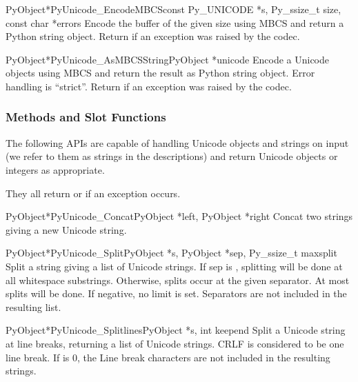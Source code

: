 \begin{cfuncdesc}{PyObject*}{PyUnicode_EncodeMBCS}{const Py_UNICODE *s,
                                               Py_ssize_t size,
                                               const char *errors}
  Encode the  buffer of the given size using MBCS
  and return a Python string object.  Return \NULL{} if an exception
  was raised by the codec.
\end{cfuncdesc}

\begin{cfuncdesc}{PyObject*}{PyUnicode_AsMBCSString}{PyObject *unicode}
  Encode a Unicode objects using MBCS and return the result as
  Python string object.  Error handling is ``strict''.  Return
  \NULL{} if an exception was raised by the codec.
\end{cfuncdesc}


\subsubsection{Methods and Slot Functions \label{unicodeMethodsAndSlots}}

The following APIs are capable of handling Unicode objects and strings
on input (we refer to them as strings in the descriptions) and return
Unicode objects or integers as appropriate.

They all return \NULL{} or  if an exception occurs.

\begin{cfuncdesc}{PyObject*}{PyUnicode_Concat}{PyObject *left,
                                               PyObject *right}
  Concat two strings giving a new Unicode string.
\end{cfuncdesc}

\begin{cfuncdesc}{PyObject*}{PyUnicode_Split}{PyObject *s,
                                              PyObject *sep,
                                              Py_ssize_t maxsplit}
  Split a string giving a list of Unicode strings.  If sep is \NULL{},
  splitting will be done at all whitespace substrings.  Otherwise,
  splits occur at the given separator.  At most  splits
  will be done.  If negative, no limit is set.  Separators are not
  included in the resulting list.
\end{cfuncdesc}

\begin{cfuncdesc}{PyObject*}{PyUnicode_Splitlines}{PyObject *s,
                                                   int keepend}
  Split a Unicode string at line breaks, returning a list of Unicode
  strings.  CRLF is considered to be one line break.  If 
  is 0, the Line break characters are not included in the resulting
  strings.
\end{cfuncdesc}

